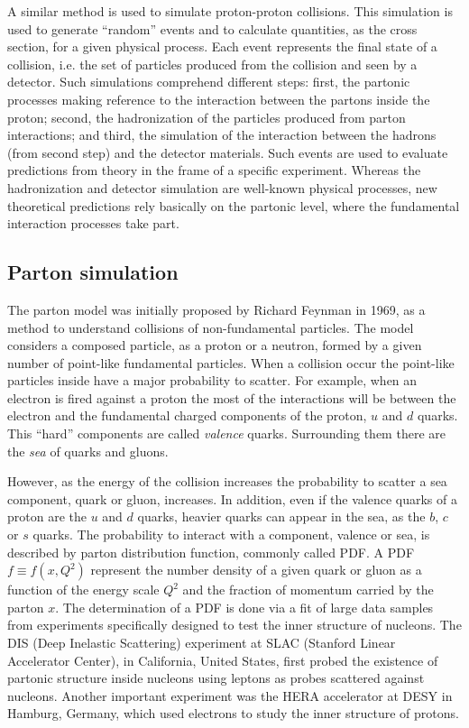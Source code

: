 A similar method is used to simulate proton-proton collisions. This simulation is used to generate ``random'' events and to calculate quantities, as the cross section, for a given physical process. Each event represents the final state of a collision, i.e. the set of particles produced from the collision and seen by a detector. Such simulations comprehend different steps: first, the partonic processes making reference to the interaction between the partons inside the proton; second, the hadronization of the particles produced from parton interactions; and third, the simulation of the interaction between the hadrons (from second step) and the detector materials. Such events are used to evaluate predictions from theory in the frame of a specific experiment. Whereas the hadronization and detector simulation are well-known physical processes, new theoretical predictions rely basically on the partonic level, where the fundamental interaction processes take part.

\subsection{Parton simulation}
\label{sec:parton}

The parton model was initially proposed by Richard Feynman in 1969, as a method to understand collisions of non-fundamental particles. The model considers a composed particle, as a proton or a neutron, formed by a given number of point-like fundamental particles. When a collision occur the point-like particles inside have a major probability to scatter. For example, when an electron is fired against a proton the most of the interactions will be between the electron and the fundamental charged components of the proton, $u$ and $d$ quarks. This ``hard'' components are called \textit{valence} quarks. Surrounding them there are the \textit{sea} of quarks and gluons.

However, as the energy of the collision increases the probability to scatter a sea component, quark or gluon, increases. In addition, even if the valence quarks of a proton are the $u$ and $d$ quarks, heavier quarks can appear in the sea, as the $b$, $c$ or $s$ quarks. The probability to interact with a component, valence or sea, is described by parton distribution function, commonly called PDF. A PDF $f\equiv f(x,Q^{2})$ represent the number density of a given quark or gluon as a function of the energy scale $Q^{2}$ and the fraction of momentum carried by the parton $x$. The determination of a PDF is done via a fit of large data samples from experiments specifically designed to test the inner structure of nucleons. The DIS (Deep Inelastic Scattering) experiment at SLAC (Stanford Linear Accelerator Center), in California, United States, first probed the existence of partonic structure inside nucleons using leptons as probes scattered against nucleons. Another important experiment was the HERA accelerator at DESY in Hamburg, Germany, which used electrons to study the inner structure of protons.

